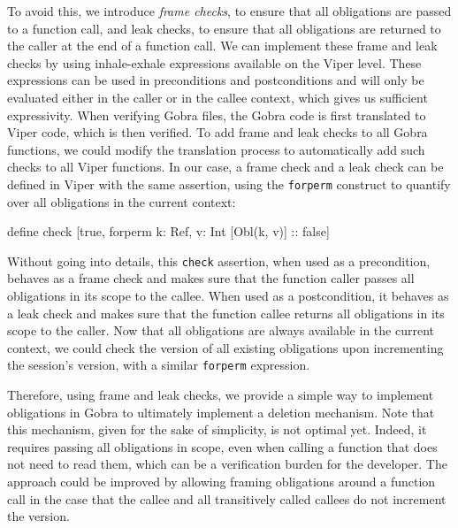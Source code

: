 To avoid this, we introduce \emph{frame checks}, to ensure that all obligations are passed to a function call, and leak checks, to ensure that all obligations are returned to the caller at the end of a function call.
We can implement these frame and leak checks by using inhale-exhale expressions available on the Viper level.
These expressions can be used in preconditions and postconditions and will only be evaluated either in the caller or in the callee context, which gives us sufficient expressivity.
When verifying Gobra files, the Gobra code is first translated to Viper code, which is then verified.
To add frame and leak checks to all Gobra functions, we could modify the translation process to automatically add such checks to all Viper functions.
In our case, a frame check and a leak check can be defined in Viper with the same assertion, using the \texttt{forperm} construct to quantify over all obligations in the current context:
\begin{gobra}
define check [true, forperm k: Ref, v: Int [Obl(k, v)] :: false]
\end{gobra}
Without going into details, this \texttt{check} assertion, when used as a precondition, behaves as a frame check and makes sure that the function caller passes all obligations in its scope to the callee. When used as a postcondition, it behaves as a leak check and makes sure that the function callee returns all obligations in its scope to the caller.
Now that all obligations are always available in the current context, we could check the version of all existing obligations upon incrementing the session's version, with a similar \texttt{forperm} expression.

Therefore, using frame and leak checks, we provide a simple way to implement obligations in Gobra to ultimately implement a deletion mechanism.
Note that this mechanism, given for the sake of simplicity, is not optimal yet. Indeed, it requires passing all obligations in scope, even when calling a function that does not need to read them, which can be a verification burden for the developer.
The approach could be improved by allowing framing obligations around a function call in the case that the callee and all transitively called callees do not increment the version.
